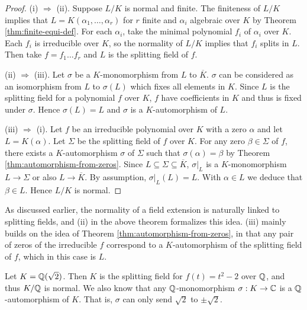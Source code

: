 \begin{proof}
    (i) $\Rightarrow$ (ii). 
    Suppose $L/K$ is normal and finite. The finiteness of $L/K$ implies that $L = K(\alpha_1, \dots, \alpha_r)$ for $r$ finite and $\alpha_i$ algebraic over $K$ by Theorem \ref{thm:finite-equi-def}. For each $\alpha_i$, take the minimal polynomial $f_i$ of $\alpha_i$ over $K$. Each $f_i$ is irreducible over $K$, so the normality of $L/K$ implies that $f_i$ splits in $L$.  Then take $f = f_1 \dots f_r$ and $L$ is the splitting field of $f$.
	
    

    (ii) $\Rightarrow$ (iii). Let $\sigma$ be a $K$-monomorphism from $L$ to $\overline K$. $\sigma$ can be considered as an isomorphism from $L$ to $\sigma(L)$ which fixes all elements in $K$. Since $L$ is the splitting field for a polynomial $f$ over $K$, $f$ have coefficients in $K$ and thus is fixed under $\sigma$. Hence $\sigma(L) = L$ and $\sigma$ is a $K$-automorphism of $L$. 
    
    (iii) $\Rightarrow$ (i). Let $f$ be an irreducible polynomial over $K$ with a zero $\alpha$ and let $L = K(\alpha)$. Let $\Sigma$ be the splitting field of $f$ over $K$. For any zero $\beta \in \Sigma$ of $f$, there exists a $K$-automorphism $\sigma$ of $\Sigma $ such that $\sigma(\alpha) = \beta$ by Theorem \ref{thm:automorphism-from-zeros}. Since $L \subseteq \Sigma \subseteq \overline K$, $\sigma | _ L$ is a $K$-monomorphism $L \to \Sigma$ or also $L \to \overline K$. By assumption, $\sigma|_L(L) = L$. With $\alpha \in L$ we deduce that $\beta \in L$. Hence $L/K$ is normal.
\end{proof}

As discussed earlier, the normality of a field extension is naturally linked to splitting fields, and (ii) in the above theorem formalizes this idea. (iii) mainly builds on the idea of Theorem \ref{thm:automorphism-from-zeros}, in that any pair of zeros of the irreducible $f$ correspond to a $K$-automorphism of the splitting field of $f$, which in this case is $L$. 

\begin{example}
	Let $K = \mathbb Q (\sqrt 2)$. Then $K$ is the splitting field for $f(t) = t^2 - 2$ over $\mathbb Q$, and thus $K/ \mathbb Q$ is normal. We also know that any $\mathbb Q$-monomorphism $\sigma: K \to \mathbb C$ is a $\mathbb Q$-automorphism of $K$. That is, $\sigma$ can only send $\sqrt 2$ to $\pm \sqrt 2$. 
\end{example}

